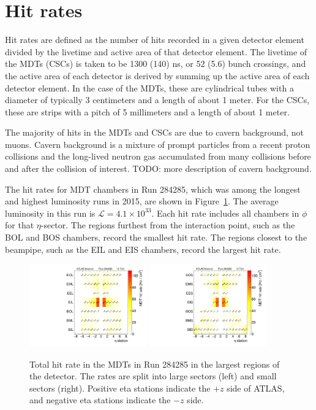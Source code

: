 \section{Hit rates}
\label{sec:hitrates}

Hit rates are defined as the number of hits recorded in a given detector element divided by the livetime and active area of that detector element. The livetime of the MDTs (CSCs) is taken to be 1300 (140) ns, or 52 (5.6) bunch crossings, and the active area of each detector is derived by summing up the active area of each detector element. In the case of the MDTs, these are cylindrical tubes with a diameter of typically 3 centimeters and a length of about 1 meter. For the CSCs, these are strips with a pitch of 5 millimeters and a length of about 1 meter.

The majority of hits in the MDTs and CSCs are due to cavern background, not muons. Cavern background is a mixture of prompt particles from a recent proton collisions and the long-lived neutron gas accumulated from many collisions before and after the collision of interest. TODO: more description of cavern background.

The hit rates for MDT chambers in Run 284285, which was among the longest and highest luminosity runs in 2015, are shown in Figure~\ref{fig:hitrates-vs-region-raw}. The average luminosity in this run is $\mathcal{L}=4.1\times10^{33}$. Each hit rate includes all chambers in $\phi$ for that $\eta$-sector. The regions furthest from the interaction point, such as the BOL and BOS chambers, record the smallest hit rate. The regions closest to the beampipe, such as the EIL and EIS chambers, record the largest hit rate.

\begin{figure}
  \begin{center}
    \includegraphics[width=0.45\textwidth]{./figures/rate_raw_vs_region_L_00284285.pdf}
    \includegraphics[width=0.45\textwidth]{./figures/rate_raw_vs_region_S_00284285.pdf}
    \caption{Total hit rate in the MDTs in Run 284285 in the largest regions of the detector. The rates are split into large sectors (left) and small sectors (right). Positive eta stations indicate the $+z$ side of ATLAS, and negative eta stations indicate the $-z$ side.}
    \label{fig:hitrates-vs-region-raw}
  \end{center}
\end{figure}

